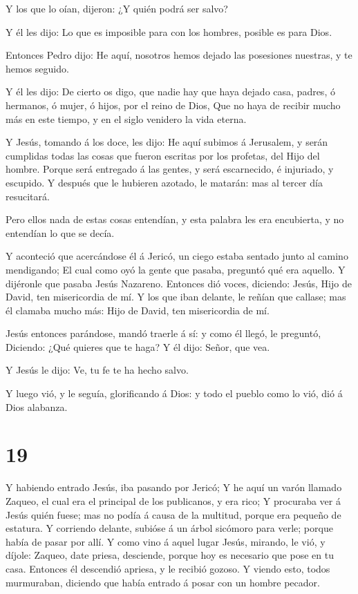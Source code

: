  Y los que lo oían, dijeron: ¿Y quién podrá ser salvo?

 Y él les dijo: Lo que es imposible para con los hombres,
posible es para Dios.

 Entonces Pedro dijo: He aquí, nosotros hemos dejado las
posesiones nuestras, y te hemos seguido.

 Y él les dijo: De cierto os digo, que nadie hay que haya
dejado casa, padres, ó hermanos, ó mujer, ó hijos, por el reino de Dios,
 Que no haya de recibir mucho más en este tiempo, y en el
siglo venidero la vida eterna.

 Y Jesús, tomando á los doce, les dijo: He aquí subimos á
Jerusalem, y serán cumplidas todas las cosas que fueron escritas por los
profetas, del Hijo del hombre.  Porque será entregado á las
gentes, y será escarnecido, é injuriado, y escupido.  Y
después que le hubieren azotado, le matarán: mas al tercer día
resucitará.

 Pero ellos nada de estas cosas entendían, y esta palabra
les era encubierta, y no entendían lo que se decía.

 Y aconteció que acercándose él á Jericó, un ciego estaba
sentado junto al camino mendigando;  El cual como oyó la
gente que pasaba, preguntó qué era aquello.  Y dijéronle
que pasaba Jesús Nazareno.  Entonces dió voces, diciendo:
Jesús, Hijo de David, ten misericordia de mí.  Y los que
iban delante, le reñían que callase; mas él clamaba mucho más: Hijo de
David, ten misericordia de mí.

 Jesús entonces parándose, mandó traerle á sí: y como él
llegó, le preguntó,  Diciendo: ¿Qué quieres que te haga? Y
él dijo: Señor, que vea.

 Y Jesús le dijo: Ve, tu fe te ha hecho salvo.

 Y luego vió, y le seguía, glorificando á Dios: y todo el
pueblo como lo vió, dió á Dios alabanza.

\hypertarget{section-18}{%
\section{19}\label{section-18}}

 Y habiendo entrado Jesús, iba pasando por Jericó;
 Y he aquí un varón llamado Zaqueo, el cual era el principal
de los publicanos, y era rico;  Y procuraba ver á Jesús
quién fuese; mas no podía á causa de la multitud, porque era pequeño de
estatura.  Y corriendo delante, subióse á un árbol sicómoro
para verle; porque había de pasar por allí.  Y como vino á
aquel lugar Jesús, mirando, le vió, y díjole: Zaqueo, date priesa,
desciende, porque hoy es necesario que pose en tu casa. 
Entonces él descendió apriesa, y le recibió gozoso.  Y
viendo esto, todos murmuraban, diciendo que había entrado á posar con un
hombre pecador.

